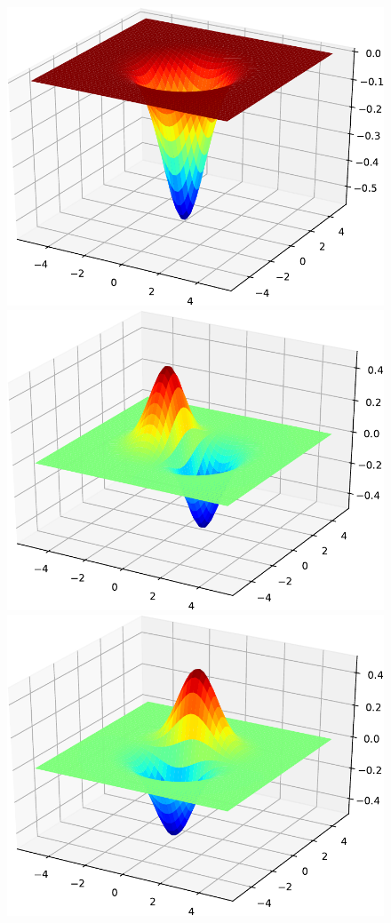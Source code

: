 \begin{figure}[H]
{\centering
\includegraphics[scale=0.3]{../codes/sch_2d/IMG_harmonic_psi_1.pdf}\\
\includegraphics[scale=0.3]{../codes/sch_2d/IMG_harmonic_psi_2.pdf}%
\includegraphics[scale=0.3]{../codes/sch_2d/IMG_harmonic_psi_3.pdf}\\
}
\end{figure}
